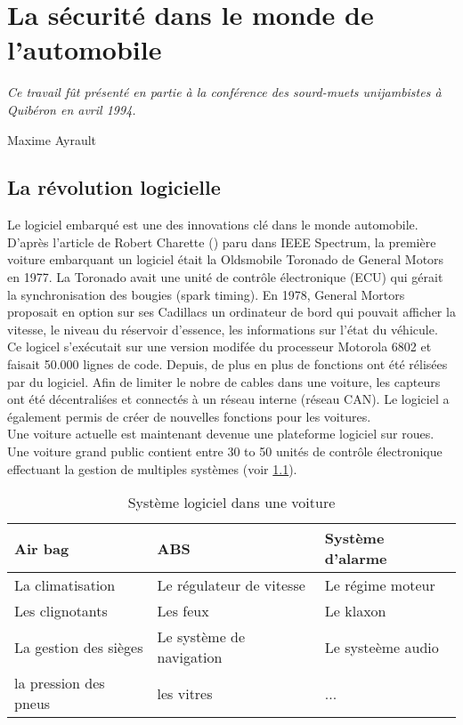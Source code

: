 
\chapter{La s\'ecurit\'e dans le monde de l'automobile} \label{CHAP2}
\smallskip
\hfill
\begin{minipage}[b]{8cm}
{\it Ce travail f\^ut pr\'esent\'e en partie \`a la conf\'erence des sourd-muets unijambistes \`a Quib\'eron en avril 1994.}
\end{minipage}
\begin{flushright} Maxime Ayrault \end{flushright}
\vskip 2cm

\section {La r\'evolution logicielle}
\medskip
{\Huge L}e logiciel embarqu\'e est une des innovations cl\'e dans le monde automobile.
D'apr\`es l'article de Robert Charette (\cite{Cha09}) paru dans IEEE Spectrum, la premi\`ere voiture embarquant un logiciel \'etait la Oldsmobile Toronado de General Motors en 1977. La Toronado avait une unit\'e de contr\^ole \'electronique (ECU) qui g\'erait la synchronisation des bougies (spark timing). En 1978, General Mortors proposait en option sur ses Cadillacs un ordinateur de bord qui pouvait afficher la vitesse, le niveau du r\'eservoir d'essence, les informations sur l'\'etat du v\'ehicule. Ce logicel s'ex\'ecutait sur une version modif\'ee du processeur Motorola 6802 et faisait 50.000 lignes de code. Depuis, de plus en plus de fonctions ont \'et\'e r\'elis\'ees par du logiciel. Afin de limiter le nobre de cables dans une voiture, les capteurs ont \'et\'e d\'ecentrali\'ses et connect\'es \`a un r\'eseau interne (r\'eseau CAN). Le logiciel a \'egalement permis de cr\'eer de nouvelles fonctions pour les voitures. \\
Une voiture actuelle est maintenant devenue une plateforme logiciel sur roues. Une voiture grand public contient entre 30 to 50 unit\'es de contr\^ole \'electronique effectuant la gestion de multiples syst\`emes (voir \ref{tab:soft}).

\FloatBarrier
\begin{table}
\centering
\begin{tabular}{| l | l | l |}
\hline
Air bag & ABS & Syst\`eme d'alarme \\
\hline
La climatisation & Le r\'egulateur de vitesse & Le r\'egime moteur \\
\hline
Les clignotants & Les feux & Le klaxon \\
\hline
La gestion des si\`eges & Le syst\`eme de navigation & Le syste\`eme audio \\
\hline
la pression des pneus & les vitres & ... \\
\hline
\end{tabular}
\caption{Syst\`eme logiciel dans une voiture}
\label{tab:soft}
\end{table}
\FloatBarrier


